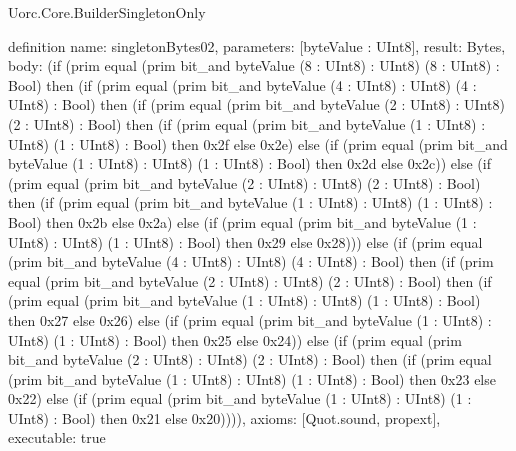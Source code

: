 \begin{lexlean}{Uorc.Core.BuilderSingletonOnly}
\begin{semanticmodule}
definition{
  name: singletonBytes02,
  parameters: [byteValue : UInt8],
  result: Bytes,
  body: (if (prim equal (prim bit_and byteValue (8 : UInt8) : UInt8) (8 : UInt8) : Bool) then (if (prim equal (prim bit_and byteValue (4 : UInt8) : UInt8) (4 : UInt8) : Bool) then (if (prim equal (prim bit_and byteValue (2 : UInt8) : UInt8) (2 : UInt8) : Bool) then (if (prim equal (prim bit_and byteValue (1 : UInt8) : UInt8) (1 : UInt8) : Bool) then 0x2f else 0x2e) else (if (prim equal (prim bit_and byteValue (1 : UInt8) : UInt8) (1 : UInt8) : Bool) then 0x2d else 0x2c)) else (if (prim equal (prim bit_and byteValue (2 : UInt8) : UInt8) (2 : UInt8) : Bool) then (if (prim equal (prim bit_and byteValue (1 : UInt8) : UInt8) (1 : UInt8) : Bool) then 0x2b else 0x2a) else (if (prim equal (prim bit_and byteValue (1 : UInt8) : UInt8) (1 : UInt8) : Bool) then 0x29 else 0x28))) else (if (prim equal (prim bit_and byteValue (4 : UInt8) : UInt8) (4 : UInt8) : Bool) then (if (prim equal (prim bit_and byteValue (2 : UInt8) : UInt8) (2 : UInt8) : Bool) then (if (prim equal (prim bit_and byteValue (1 : UInt8) : UInt8) (1 : UInt8) : Bool) then 0x27 else 0x26) else (if (prim equal (prim bit_and byteValue (1 : UInt8) : UInt8) (1 : UInt8) : Bool) then 0x25 else 0x24)) else (if (prim equal (prim bit_and byteValue (2 : UInt8) : UInt8) (2 : UInt8) : Bool) then (if (prim equal (prim bit_and byteValue (1 : UInt8) : UInt8) (1 : UInt8) : Bool) then 0x23 else 0x22) else (if (prim equal (prim bit_and byteValue (1 : UInt8) : UInt8) (1 : UInt8) : Bool) then 0x21 else 0x20)))),
  axioms: [Quot.sound, propext],
  executable: true
}


\end{semanticmodule}
\end{lexlean}
